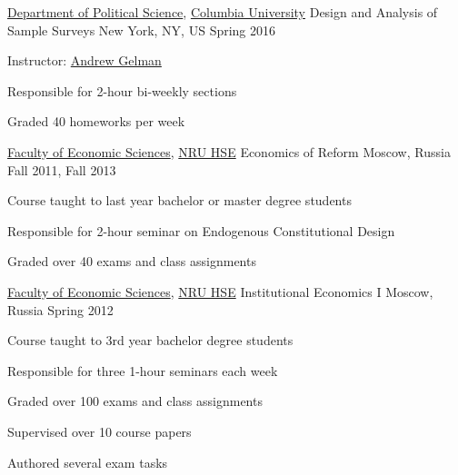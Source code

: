 

\begin{cventries}

  \cventry
    {\href{http://polisci.columbia.edu/}{Department of Political Science}, \href{http://www.columbia.edu/}{Columbia University}} %
    {Design and Analysis of Sample Surveys} %
    {New York, NY, US} %
    {Spring 2016} %
    {
      \begin{cvitems} %
        \item {Instructor: \href{http://www.stat.columbia.edu/~gelman/}{Andrew Gelman}}
        \item {Responsible for 2-hour bi-weekly sections}
        \item {Graded 40 homeworks per week}
      \end{cvitems}
    }

  \cventry
    {\href{https://economics.hse.ru/en/}{Faculty of Economic Sciences}, \href{http://www.hse.ru/en/}{NRU HSE}} %
    {Economics of Reform} %
    {Moscow, Russia} %
    {Fall 2011, Fall 2013} %
    {
      \begin{cvitems} %
        \item {Course taught to last year bachelor or master degree students}
        \item {Responsible for 2-hour seminar on Endogenous Constitutional Design}
        \item {Graded over 40 exams and class assignments}
      \end{cvitems}
    }

  \cventry
    {\href{https://economics.hse.ru/en/}{Faculty of Economic Sciences}, \href{http://www.hse.ru/en/}{NRU HSE}} %
    {Institutional Economics I} %
    {Moscow, Russia} %
    {Spring 2012} %
    {
      \begin{cvitems} %
        \item {Course taught to 3rd year bachelor degree students}
        \item {Responsible for three 1-hour seminars each week}
        \item {Graded over 100 exams and class assignments}
        \item {Supervised over 10 course papers}
        \item {Authored several exam tasks}
      \end{cvitems}
    }


\end{cventries}
